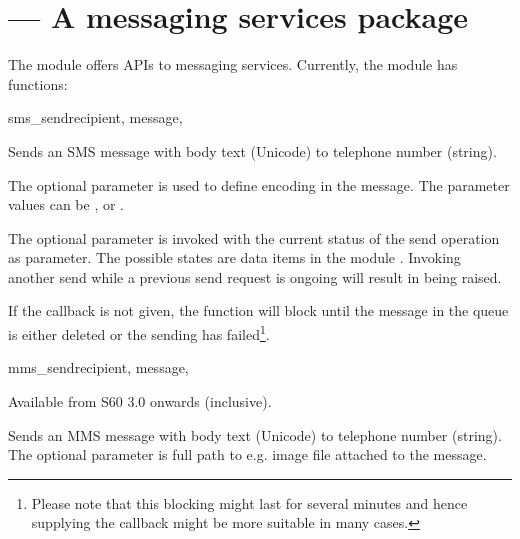 %
%
%

\section{ --- 
    A messaging services package}
\label{sec:messaging}


The  module offers APIs to messaging services. Currently, 
the  module has functions:

\begin{funcdesc}{sms_send}{recipient, message, }

Sends an SMS message with body text  (Unicode) to 
telephone number  (string). 

The optional parameter  is used to define encoding in the message. 
The parameter values can be ,  or .

The optional parameter  is invoked with the current status of the 
send operation as parameter. The possible states are data items in the module 
. Invoking another send while a previous send request is ongoing 
will result in  being raised.

If the callback is not given, the  function will block until the 
message in the queue is either deleted or the sending has failed\footnote{Please 
note that this blocking might last for several minutes and hence supplying the 
callback might be more suitable in many cases.}. 
\end{funcdesc}

\begin{funcdesc}{mms_send}{recipient, message, }

\begin{notice}[note]
Available from S60 3.0 onwards (inclusive).
\end{notice}

Sends an MMS message with body text  (Unicode) to telephone number 
 (string). The optional parameter  is full path 
to e.g. image file attached to the message.

\end{funcdesc}

